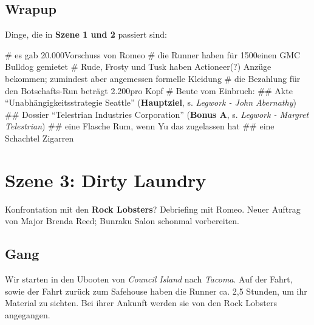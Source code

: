 \subsection{Wrapup}

Dinge, die in \textbf{Szene 1 und 2} passiert sind:

\begin{easylist}
    # es gab 20.000\nuyen Vorschuss von Romeo
    # die Runner haben für 1500\nuyen einen GMC Bulldog gemietet
    # Rude, Frosty und Tusk haben Actioneer(?) Anzüge bekommen; zumindest aber angemessen formelle Kleidung
    # die Bezahlung für den Botschafts-Run beträgt 2.200\nuyen pro Kopf
    # Beute vom Einbruch:
    ## Akte ``Unabhängigkeitsstrategie Seattle'' (\textbf{Hauptziel}, s. \textit{Legwork - John Abernathy})
    ## Dossier ``Telestrian Industries Corporation'' (\textbf{Bonus A}, s. \textit{Legwork - Margret Telestrian})
    ## eine Flasche Rum, wenn Yu das zugelassen hat
    ## eine Schachtel Zigarren
\end{easylist}


\section{Szene 3: Dirty Laundry}

Konfrontation mit den \textbf{Rock Lobsters}? Debriefing mit Romeo. Neuer Auftrag von Major Brenda Reed; Bunraku Salon schonmal vorbereiten.


\subsection{Gang }

Wir starten in den Ubooten von \textit{Council Island} nach \textit{Tacoma}. Auf der Fahrt, sowie der Fahrt zurück zum Safehouse haben die Runner ca. 2,5 Stunden, um ihr Material zu sichten. Bei ihrer Ankunft werden sie von den Rock Lobsters angegangen.



